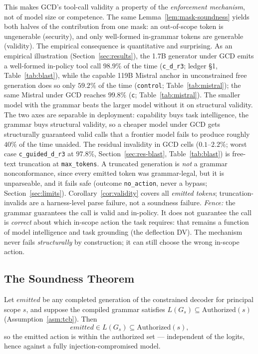 \noindent
This makes GCD's tool-call validity a property of the \emph{enforcement mechanism}, not of model size or competence. The same Lemma~\ref{lem:mask-soundness} yields both halves of the contribution from one mask: an out-of-scope token is ungenerable (security), and only well-formed in-grammar tokens are generable (validity). The empirical consequence is quantitative and surprising. As an empirical illustration (Section~\ref{sec:results}), the 1.7B generator under GCD emits a well-formed in-policy tool call \(98.9\%\) of the time (\texttt{c\_d\_r3}; ledger \S1, Table~\ref{tab:blast}), while the capable 119B Mistral anchor in unconstrained free generation does so only \(59.2\%\) of the time (\texttt{control}; Table~\ref{tab:mistral}); the same Mistral under GCD reaches \(99.8\%\) (\texttt{c}; Table~\ref{tab:mistral}). The smaller model with the grammar beats the larger model without it on structural validity. The two axes are separable in deployment: capability buys task intelligence, the grammar buys structural validity, so a cheaper model under GCD gets structurally guaranteed valid calls that a frontier model fails to produce roughly \(40\%\) of the time unaided. The residual invalidity in GCD cells (\(0.1\)--\(2.2\%\); worst case \texttt{c\_guided\_d\_r3} at \(97.8\%\), Section~\ref{sec:res-blast}, Table~\ref{tab:blast}) is free-text truncation at \texttt{max\_tokens}. A truncated generation is \emph{not} a grammar nonconformance, since every emitted token was grammar-legal, but it is unparseable, and it fails safe (outcome \texttt{no\_action}, never a bypass; Section~\ref{sec:limits}). Corollary~\ref{cor:validity} covers all \emph{emitted tokens}; truncation-invalids are a harness-level parse failure, not a soundness failure. \emph{Fence:} the grammar guarantees the call is valid and in-policy. It does not guarantee the call is \emph{correct} about which in-scope action the task requires: that remains a function of model intelligence and task grounding (the deflection DV). The mechanism never fails \emph{structurally} by construction; it can still choose the wrong in-scope action.

\subsection{The Soundness Theorem}
\label{sub:formal-theorem}

\begin{theorem}
\label{thm:soundness}
Let \(\textit{emitted}\) be any completed generation of the constrained decoder for principal scope \(s\), and suppose the compiled grammar satisfies \(L(G_s) \subseteq \mathrm{Authorized}(s)\) (Assumption~\ref{asm:tcb}). Then
\begin{equation}
\label{eq:soundness}
\textit{emitted} \in L(G_s) \subseteq \mathrm{Authorized}(s),
\end{equation}
so the emitted action is within the authorized set --- independent of the logits, hence against a fully injection-compromised model.
\end{theorem}

